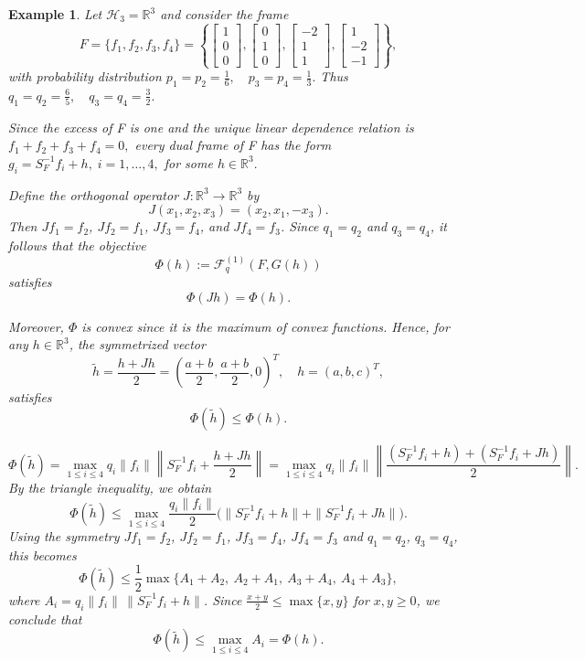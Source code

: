 \documentclass[final,1p,times]{elsarticle}
\newtheorem{example}[thm]{Example}
\begin{document}
\begin{example}
Let $\mathcal{H}_3=\mathbb{R}^3$ and consider the frame
\[
F=\{f_1,f_2,f_3,f_4\}
=
\left\{
\begin{bmatrix}1\\0\\0\end{bmatrix},
\begin{bmatrix}0\\1\\0\end{bmatrix},
\begin{bmatrix}-2\\1\\1\end{bmatrix},
\begin{bmatrix}1\\-2\\-1\end{bmatrix}
\right\},
\]
with probability distribution 
\(
p_1=p_2=\frac16,\quad p_3=p_4=\frac13.
\)\;
Thus $q_1=q_2=\frac65,\quad q_3=q_4=\frac32.$

Since the excess of F is one and the unique linear dependence relation is $f_1+f_2+f_3+f_4=0,$ every dual frame of F has the form
$g_i=S_F^{-1}f_i+h,\; i=1,\dots,4,$
for some $h\in\mathbb R^3.$

Define the orthogonal operator $J:\mathbb{R}^3\to\mathbb{R}^3$ by
\[
J(x_1,x_2,x_3)=(x_2,x_1,-x_3).
\]
Then $Jf_1=f_2$, $Jf_2=f_1$, $Jf_3=f_4$, and $Jf_4=f_3$. Since $q_1=q_2$ and $q_3=q_4$, it follows that the objective
\[
\Phi(h):=\mathcal{F}_q^{(1)}(F,G(h))
\]
satisfies
\[
\Phi(Jh)=\Phi(h).
\]

Moreover, $\Phi$ is convex since it is the maximum of convex functions. Hence, for any $h\in\mathbb{R}^3$, the symmetrized vector
\[
\widetilde{h}=\frac{h+Jh}{2}
=\left(\frac{a+b}{2},\frac{a+b}{2},0\right)^T,\quad h=(a,b,c)^T,
\]
satisfies
\[
\Phi\left(\widetilde{h} \right)\le \Phi(h).
\]
 

\[
\Phi(\widetilde{h})
=
\max_{1\le i\le 4} q_i\|f_i\|\left\|S_F^{-1}f_i+\frac{h+Jh}{2}\right\|
=
\max_{1\le i\le 4} q_i\|f_i\|\left\|\frac{(S_F^{-1}f_i+h)+(S_F^{-1}f_i+Jh)}{2}\right\|.
\]
By the triangle inequality, we obtain
\[
\Phi(\widetilde{h})
\le
\max_{1\le i\le 4} \frac{q_i\|f_i\|}{2}
\Big(
\|S_F^{-1}f_i+h\|+\|S_F^{-1}f_i+Jh\|
\Big).
\]
Using the symmetry $Jf_1=f_2$, $Jf_2=f_1$, $Jf_3=f_4$, $Jf_4=f_3$ and $q_1=q_2$, $q_3=q_4$, this becomes
\[
\Phi(\widetilde{h})
\le
\frac12 \max\Big\{
A_1+A_2,\ A_2+A_1,\ A_3+A_4,\ A_4+A_3
\Big\},
\]
where $A_i=q_i\|f_i\|\,\|S_F^{-1}f_i+h\|$. Since $\frac{x+y}{2}\le \max\{x,y\}$ for $x,y\ge 0$, we conclude that
\[
\Phi(\widetilde{h})\le \max_{1\le i\le 4} A_i=\Phi(h).
\]




\end{example}
\end{document}

